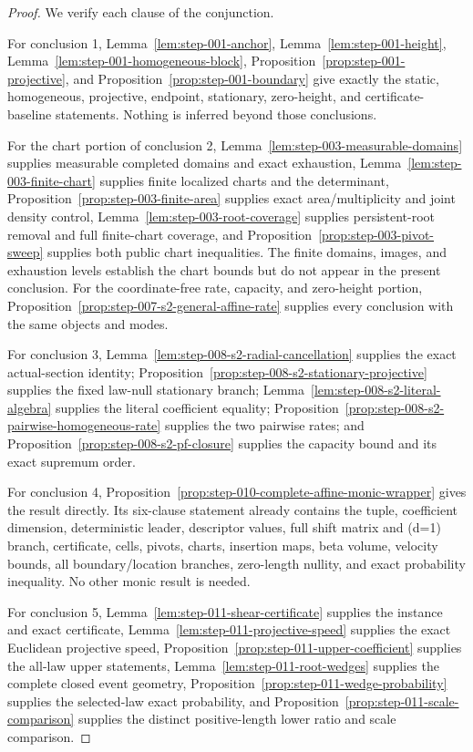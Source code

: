 \begin{proof}
We verify each clause of the conjunction.

For conclusion 1, Lemma~\ref{lem:step-001-anchor}, Lemma~\ref{lem:step-001-height},
Lemma~\ref{lem:step-001-homogeneous-block}, Proposition~\ref{prop:step-001-projective}, and
Proposition~\ref{prop:step-001-boundary} give exactly the static, homogeneous, projective, endpoint,
stationary, zero-height, and certificate-baseline statements. Nothing is inferred beyond those conclusions.

For the chart portion of conclusion 2, Lemma~\ref{lem:step-003-measurable-domains} supplies measurable
completed domains and exact exhaustion, Lemma~\ref{lem:step-003-finite-chart} supplies finite localized charts
and the determinant, Proposition~\ref{prop:step-003-finite-area} supplies exact area/multiplicity and joint
density control, Lemma~\ref{lem:step-003-root-coverage} supplies persistent-root removal and full finite-chart
coverage, and Proposition~\ref{prop:step-003-pivot-sweep} supplies both public chart inequalities.
The finite domains, images, and exhaustion levels establish the chart bounds
but do not appear in the present conclusion. For the coordinate-free rate, capacity, and zero-height portion,
Proposition~\ref{prop:step-007-s2-general-affine-rate} supplies every conclusion with the same
objects and modes.

For conclusion 3, Lemma~\ref{lem:step-008-s2-radial-cancellation} supplies the exact actual-section identity;
Proposition~\ref{prop:step-008-s2-stationary-projective} supplies the fixed law-null stationary branch;
Lemma~\ref{lem:step-008-s2-literal-algebra} supplies the literal coefficient equality;
Proposition~\ref{prop:step-008-s2-pairwise-homogeneous-rate} supplies the two pairwise rates; and
Proposition~\ref{prop:step-008-s2-pf-closure} supplies the capacity bound and its exact supremum order.

For conclusion 4, Proposition~\ref{prop:step-010-complete-affine-monic-wrapper} gives the result directly.
Its six-clause statement already contains the tuple, coefficient dimension, deterministic leader, descriptor
values, full shift matrix and (d=1) branch, certificate, cells, pivots, charts, insertion maps, beta volume,
velocity bounds, all boundary/location branches, zero-length nullity, and exact probability inequality. No
other monic result is needed.

For conclusion 5, Lemma~\ref{lem:step-011-shear-certificate} supplies the instance and exact certificate,
Lemma~\ref{lem:step-011-projective-speed} supplies the exact Euclidean projective speed,
Proposition~\ref{prop:step-011-upper-coefficient} supplies the all-law upper statements,
Lemma~\ref{lem:step-011-root-wedges} supplies the complete closed event geometry,
Proposition~\ref{prop:step-011-wedge-probability} supplies the selected-law exact probability, and
Proposition~\ref{prop:step-011-scale-comparison} supplies the distinct positive-length lower ratio and scale
comparison.


\end{proof}
